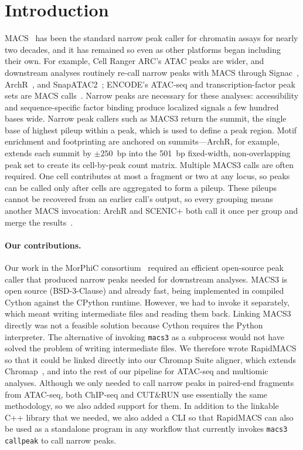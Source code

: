 \documentclass[namedate,webpdf,contemporary,large]{oup-authoring-template}
\begin{document}
\section{Introduction}
MACS~\citep{macs3} has been the standard narrow peak caller for chromatin assays for nearly two decades, and it has remained so even as other platforms began including their own. For example, Cell Ranger ARC's ATAC peaks are wider, and downstream analyses routinely re-call narrow peaks with MACS through Signac~\citep{signac}, ArchR~\citep{archr}, and SnapATAC2~\citep{snapatac2}; ENCODE's ATAC-seq and transcription-factor peak sets are MACS calls~\citep{encode_consortium}. Narrow peaks are necessary for these analyses: accessibility and sequence-specific factor binding produce localized signals a few hundred bases wide. Narrow peak callers such as MACS3 return the summit, the single base of highest pileup within a peak, which is used to define a peak region. Motif enrichment and footprinting are anchored on summits---ArchR, for example, extends each summit by $\pm250$~bp into the 501~bp fixed-width, non-overlapping peak set to create its cell-by-peak count matrix. Multiple MACS3 calls are often required. One cell contributes at most a fragment or two at any locus, so peaks can be called only after cells are aggregated to form a pileup. These pileups cannot be recovered from an earlier call's output, so every grouping means another MACS invocation: ArchR and SCENIC+ both call it once per group and merge the results~\citep{scenicplus}.

\paragraph{Our contributions.}
Our work in the MorPhiC consortium~\citep{morphic} required an efficient open-source peak caller that produced narrow peaks needed for downstream analyses. MACS3 is open source (BSD-3-Clause) and already fast, being implemented in compiled Cython against the CPython runtime. However, we had to invoke it separately, which meant writing intermediate files and reading them back. Linking MACS3 directly was not a feasible solution because Cython requires the Python interpreter. The alternative of invoking \texttt{macs3} as a subprocess would not have solved the problem of writing intermediate files. We therefore wrote RapidMACS so that it could be linked directly into our Chromap Suite aligner, which extends Chromap~\citep{chromap}, and into the rest of our pipeline for ATAC-seq and multiomic analyses. Although we only needed to call narrow peaks in paired-end fragments from ATAC-seq, both ChIP-seq and CUT\&RUN use essentially the same methodology, so we also added support for them. In addition to the linkable C++ library that we needed, we also added a CLI so that RapidMACS can also be used as a standalone program in any workflow that currently invokes \texttt{macs3 callpeak} to call narrow peaks.
\end{document}
